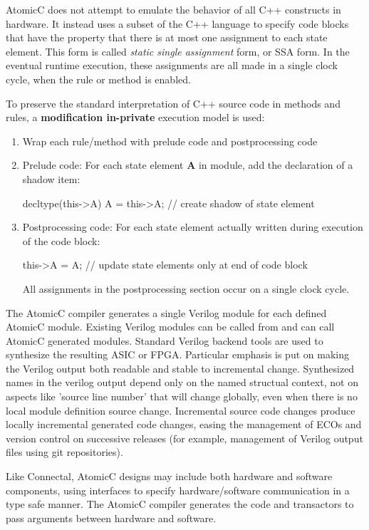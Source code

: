 AtomicC does not attempt to emulate the behavior of all C++ constructs in hardware.
It instead uses a subset of the C++ language to specify
code blocks that have the property that there is at most
one assignment to each state element.
This form is called \textit{static single assignment} form,
or SSA form\cite{Alpern:1988}.
In the eventual runtime execution, these assignments are
all made in a single clock cycle, when the rule or method
is enabled.

To preserve the standard interpretation of C++ source code
in methods and rules,
a \textbf{modification in-private} \cite[Sec.~3.2]{Prinz03operationalsemantics}
execution model is used:
\begin{enumerate}
\item Wrap each rule/method with prelude code and postprocessing code
\item Prelude code:
For each state element \textbf{A} in module, add the declaration of a shadow item:
\begin{codeblock}
decltype(this->A) A = this->A;    // create shadow of state element
\end{codeblock}
\item Postprocessing code:
For each state element actually written during execution of the code block:
\begin{codeblock}
this->A = A;                // update state elements only at end of code block
\end{codeblock}
All assignments in the postprocessing section occur on a single clock cycle.
\end{enumerate}

The AtomicC compiler 
generates a single Verilog module for each defined AtomicC module.
Existing Verilog modules can be called from and can call AtomicC
generated modules.
Standard Verilog backend tools are used to synthesize
the resulting ASIC or FPGA.
Particular emphasis is put on making the Verilog output both readable
and stable to incremental change.  Synthesized names in the verilog
output depend only on the named structual context, not on aspects
like 'source line number' that will change globally, even when there is no
local module definition source change.
Incremental source code changes produce locally incremental generated
code changes, easing the management of ECOs and version control
on successive releases (for example, management of Verilog output
files using git repositories).

Like Connectal\cite{king2015software}, AtomicC designs may include both hardware and
software components, using interfaces to specify hardware/software communication
in a type safe manner. The AtomicC compiler generates the code and transactors to pass
arguments between hardware and software.

